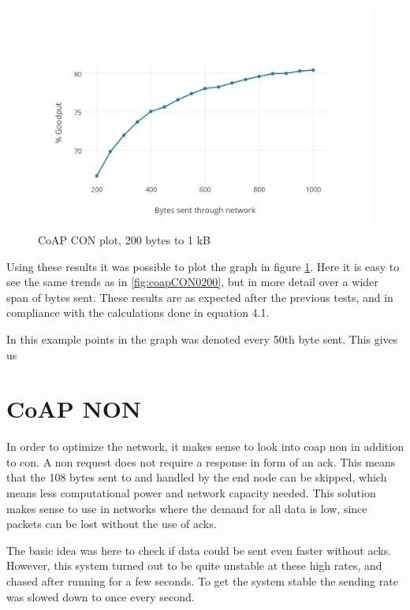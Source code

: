 \begin{figure}[ht]
    \centering
    \includegraphics[width=\textwidth]{wireshark200-K_7.png}    
    \caption{CoAP CON plot, 200 bytes to 1 kB}
    \label{fig:plotCoAPCON200toK}
\end{figure}

Using these results it was possible to plot the graph in figure \ref{fig:plotCoAPCON200toK}. Here it is easy to see the same trends as in  \ref{fig:coapCON0200}, but in more detail over a wider span of bytes sent. These results are as expected after the previous tests, and in compliance with the calculations done in equation 4.1. 

In this example points in the graph was denoted every 50th byte sent. This gives us 


\section{CoAP NON}

In order to optimize the network, it makes sense to look into \gls{coap} \gls{non} in addition to \gls{con}. A \gls{non} request does not require a response in form of an \gls{ack}. This means that the 108 bytes sent to and handled by the end node can be skipped, which means less computational power and network capacity needed. This solution makes sense to use in networks where the demand for all data is low, since packets can be lost without the use of \glspl{ack}. 

The basic idea was here to check if data could be sent even faster without \glspl{ack}. However, this system turned out to be quite unstable at these high rates, and chased after running for a few seconds. To get the system stable the sending rate was slowed down to once every second. 

